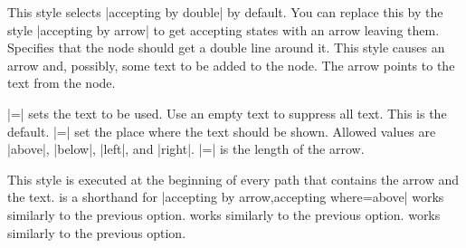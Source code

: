 \begin{itemize}
  This style selects |accepting by double| by default. You can replace
  this by the style |accepting by arrow| to get accepting states with
  an arrow leaving them.
  Specifies that the node should get a double line around it.
  This style causes an arrow and, possibly, some text to be added to
  the node. The arrow points to the text from the node.
  \begin{itemize}
  |=| sets the text to be
  used. Use an empty text to suppress all text. This is the default.
  |=| set the place where
  the text should be shown. Allowed values are |above|, |below|,
  |left|, and |right|.
  |=| is the length of the
  arrow.
  \end{itemize}
\begin{codeexample}[]
\end{codeexample}
  This style is executed at the beginning of every path that contains
  the arrow and the text.
   is a shorthand for
  |accepting by arrow,accepting where=above|
   works similarly to the previous option.
   works similarly to the previous option.
   works similarly to the previous option.
\end{itemize}

